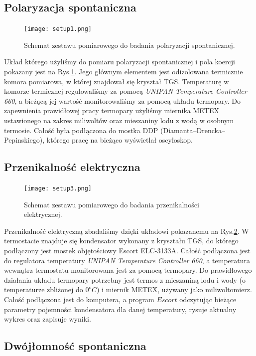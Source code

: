 \documentclass{article}
\begin{document}
\subsection{Polaryzacja spontaniczna}

\begin{figure}[!h]
	\centering
 	\texttt{[image: setup1.png]}
 	\caption{Schemat zestawu pomiarowego do badania polaryzacji spontanicznej.}
 	\label{fig:setup1}
\end{figure}

Układ którego użyliśmy do pomiaru polaryzacji spontanicznej i pola koercji pokazany jest na Rys.\ref{fig:setup1}. Jego głównym elementem jest odizolowana termicznie komora pomiarowa, w której znajdował się kryształ TGS. Temperaturę w komorze termicznej regulowaliśmy za pomocą \textit{UNIPAN Temperature Controller 660}, a bieżącą jej wartość monitorowaliśmy za pomocą układu termopary. Do zapewnienia prawidłowej pracy termopary użyliśmy miernika METEX ustawionego na zakres miliwoltów oraz mieszaniny lodu z wodą w osobnym termosie. Całość była podłączona do mostka DDP (Diamanta–Drencka–Pepinskiego), którego pracę na bieżąco wyświetlał oscyloskop.

\subsection{Przenikalność elektryczna}

\begin{figure}[!h]
	\centering
	\texttt{[image: setup3.png]}
	\caption{Schemat zestawu pomiarowego do badania przenikalności elektrycznej.}
	\label{fig:setup3}
\end{figure}

Przenikalność elektryczną zbadaliśmy dzięki układowi pokazanemu na Rys.\ref{fig:setup3}. W termostacie znajduje się kondensator wykonany z kryształu TGS, do którego podłączony jest mostek objętościowy Escort ELC-3133A. Całość podłączona jest do regulatora temperatury \textit{UNIPAN Temperature Controller 660}, a temperatura wewnątrz termostatu monitorowana jest za pomocą termopary. Do prawidłowego działania układu termopary potrzebny jest termos z mieszaniną lodu i wody (o temperaturze zbliżonej do $0^{o}C$) i miernik METEX, używany jako miliwoltomierz. Całość podłączona jest do komputera, a program $Escort$ odczytując bieżące parametry pojemności kondensatora dla danej temperatury, rysuje aktualny wykres oraz zapisuje wyniki.

\subsection{Dwójłomność spontaniczna}
\end{document}
